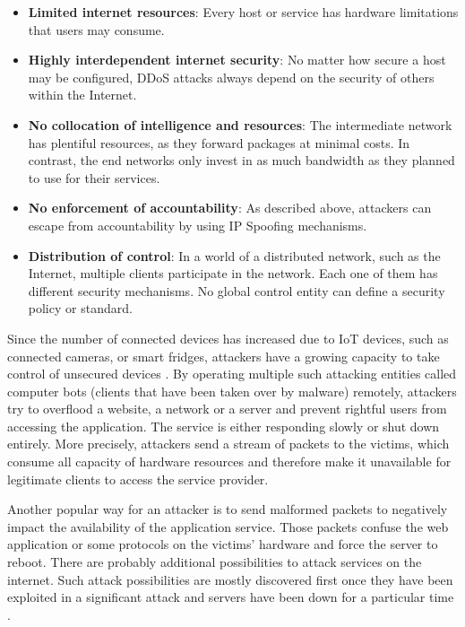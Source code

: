 \begin{itemize}
  \item \textbf{Limited internet resources}: Every host or service has hardware limitations that users may consume.
  \item \textbf{Highly interdependent internet security}: No matter how secure a host may be configured, DDoS attacks always depend on the security of others within the Internet.
  \item \textbf{No collocation of intelligence and resources}: The intermediate network has plentiful resources, as they forward packages at minimal costs.  In contrast, the end networks only invest in as much bandwidth as they planned to use for their services.
  \item \textbf{No enforcement of accountability}: As described above, attackers can escape from accountability by using IP Spoofing mechanisms.
  \item \textbf{Distribution of control}: In a world of a distributed network, such as the Internet, multiple clients participate in the network. Each one of them has different security mechanisms. No global control entity can define a security policy or standard.
\end{itemize}
Since the number of connected devices has increased due to IoT devices, such as connected cameras, or smart fridges, attackers have a growing capacity to take control of unsecured devices \cite{Rodrigues2017}. By operating multiple such attacking entities called computer bots (clients that have been taken over by malware) remotely, attackers try to overflood a website, a network or a server and prevent rightful users from accessing the application. The service is either responding slowly or shut down entirely. More precisely, attackers send a stream of packets to the victims, which consume all capacity of hardware resources and therefore make it unavailable for legitimate clients to access the service provider.

Another popular way for an attacker is to send malformed packets to negatively impact the availability of the application service. Those packets confuse the web application or some protocols on the victims' hardware and force the server to reboot. There are probably additional possibilities to attack services on the internet. Such attack possibilities are mostly discovered first once they have been exploited in a significant attack and servers have been down for a particular time \cite{Mirkovic2004}.

